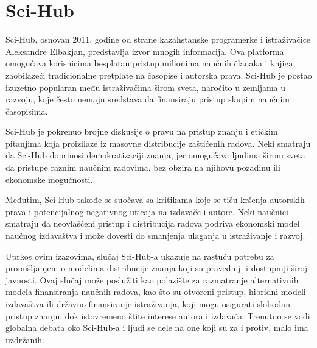 \documentclass[a4paper]{article}
\begin{document}
{\setlength{\parskip}{1em}


\section{Sci-Hub}	
\label{sec:sci-hub}

Sci-Hub, osnovan 2011. godine od strane kazahstanske programerke i istraživačice Aleksandre Elbakjan, predstavlja izvor mnogih informacija. Ova platforma omogućava korisnicima besplatan pristup milionima naučnih članaka i knjiga, zaobilazeći tradicionalne pretplate na časopise i autorska prava. Sci-Hub je postao izuzetno popularan među istraživačima širom sveta, naročito u zemljama u razvoju, koje često nemaju sredstava da finansiraju pristup skupim naučnim časopisima.
\cite{treca}

Sci-Hub je pokrenuo brojne diskusije o pravu na pristup znanju i etičkim pitanjima koja proizilaze iz masovne distribucije zaštićenih radova. Neki smatraju da Sci-Hub doprinosi demokratizaciji znanja, jer omogućava ljudima širom sveta da pristupe raznim naučnim radovima, bez obzira na njihovu pozadinu ili ekonomske mogućnosti.

Međutim, Sci-Hub takođe se suočava sa kritikama koje se tiču kršenja autorskih prava i potencijalnog negativnog uticaja na izdavače i autore. Neki naučnici smatraju da neovlašćeni pristup i distribucija radova podriva ekonomski model naučnog izdavaštva i može dovesti do smanjenja ulaganja u istraživanje i razvoj.
\cite{druga}

Uprkos ovim izazovima, slučaj Sci-Hub-a ukazuje na rastuću potrebu za promišljanjem o modelima distribucije znanja koji su pravedniji i dostupniji široj javnosti. Ovaj slučaj može poslužiti kao polazište za razmatranje alternativnih modela finansiranja naučnih radova, kao što su otvoreni pristup, hibridni modeli izdavaštva ili državno finansiranje istraživanja, koji mogu osigurati slobodan pristup znanju, dok istovremeno štite interese autora i izdavača. Trenutno se vodi globalna debata oko Sci-Hub-a i ljudi se dele na one koji su za i protiv, malo ima uzdržanih.

\cite{cetvrta}

\setlength{\parskip}{2em}


\begin{verbatim}

\end{verbatim}

}
\end{document}
